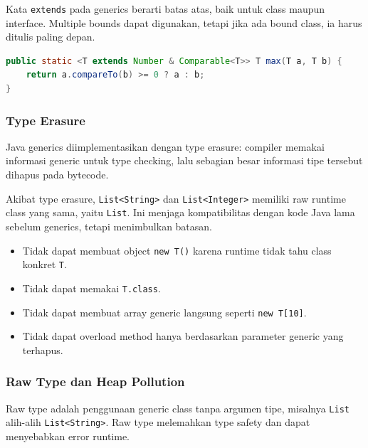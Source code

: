 Kata \texttt{extends} pada generics berarti batas atas, baik untuk class maupun interface. Multiple bounds dapat digunakan, tetapi jika ada bound class, ia harus ditulis paling depan.

\begin{lstlisting}[language=Java, caption={Multiple bounds pada generic type}, label={lst:multiple-bounds}]
public static <T extends Number & Comparable<T>> T max(T a, T b) {
    return a.compareTo(b) >= 0 ? a : b;
}
\end{lstlisting}

\subsubsection{Type Erasure}

\begin{jawab}
Java generics diimplementasikan dengan type erasure: compiler memakai informasi generic untuk type checking, lalu sebagian besar informasi tipe tersebut dihapus pada bytecode.
\end{jawab}

Akibat type erasure, \texttt{List<String>} dan \texttt{List<Integer>} memiliki raw runtime class yang sama, yaitu \texttt{List}. Ini menjaga kompatibilitas dengan kode Java lama sebelum generics, tetapi menimbulkan batasan.

\begin{itemize}
    \item Tidak dapat membuat object \texttt{new T()} karena runtime tidak tahu class konkret \texttt{T}.
    \item Tidak dapat memakai \texttt{T.class}.
    \item Tidak dapat membuat array generic langsung seperti \texttt{new T[10]}.
    \item Tidak dapat overload method hanya berdasarkan parameter generic yang terhapus.
\end{itemize}

\subsubsection{Raw Type dan Heap Pollution}

\begin{jawab}
Raw type adalah penggunaan generic class tanpa argumen tipe, misalnya \texttt{List} alih-alih \texttt{List<String>}. Raw type melemahkan type safety dan dapat menyebabkan error runtime.
\end{jawab}

